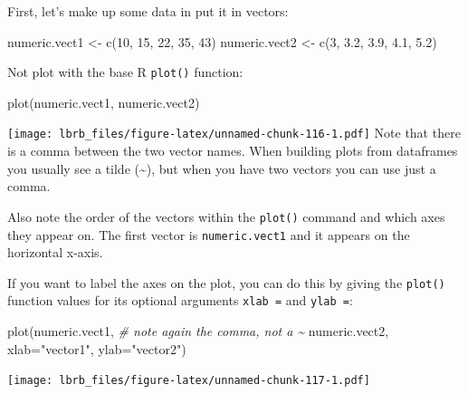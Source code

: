 \documentclass[
]{book}
\newenvironment{Shaded}{\begin{snugshade}}{\end{snugshade}}
\newcommand{\AttributeTok}[1]{\textcolor[rgb]{0.77,0.63,0.00}{#1}}
\newcommand{\CommentTok}[1]{\textcolor[rgb]{0.56,0.35,0.01}{\textit{#1}}}
\newcommand{\DecValTok}[1]{\textcolor[rgb]{0.00,0.00,0.81}{#1}}
\newcommand{\FloatTok}[1]{\textcolor[rgb]{0.00,0.00,0.81}{#1}}
\newcommand{\FunctionTok}[1]{\textcolor[rgb]{0.00,0.00,0.00}{#1}}
\newcommand{\NormalTok}[1]{#1}
\newcommand{\OtherTok}[1]{\textcolor[rgb]{0.56,0.35,0.01}{#1}}
\newcommand{\StringTok}[1]{\textcolor[rgb]{0.31,0.60,0.02}{#1}}
\begin{document}
First, let's make up some data in put it in vectors:

\begin{Shaded}
\begin{Highlighting}[]
\NormalTok{numeric.vect1 }\OtherTok{\textless{}{-}} \FunctionTok{c}\NormalTok{(}\DecValTok{10}\NormalTok{, }\DecValTok{15}\NormalTok{, }\DecValTok{22}\NormalTok{, }\DecValTok{35}\NormalTok{, }\DecValTok{43}\NormalTok{)}
\NormalTok{numeric.vect2 }\OtherTok{\textless{}{-}} \FunctionTok{c}\NormalTok{(}\DecValTok{3}\NormalTok{, }\FloatTok{3.2}\NormalTok{, }\FloatTok{3.9}\NormalTok{, }\FloatTok{4.1}\NormalTok{, }\FloatTok{5.2}\NormalTok{)}
\end{Highlighting}
\end{Shaded}

Not plot with the base R \texttt{plot()} function:

\begin{Shaded}
\begin{Highlighting}[]
\FunctionTok{plot}\NormalTok{(numeric.vect1, numeric.vect2)}
\end{Highlighting}
\end{Shaded}

\texttt{[image: lbrb\_files/figure-latex/unnamed-chunk-116-1.pdf]}
Note that there is a comma between the two vector names. When building plots from dataframes you usually see a tilde (\textasciitilde), but when you have two vectors you can use just a comma.

Also note the order of the vectors within the \texttt{plot()} command and which axes they appear on. The first vector is \texttt{numeric.vect1} and it appears on the horizontal x-axis.

If you want to label the axes on the plot, you can do this by giving the \texttt{plot()} function values for its optional arguments \texttt{xlab\ =} and \texttt{ylab\ =}:

\begin{Shaded}
\begin{Highlighting}[]
\FunctionTok{plot}\NormalTok{(numeric.vect1,   }\CommentTok{\# note again the comma, not a \textasciitilde{}}
\NormalTok{     numeric.vect2, }
     \AttributeTok{xlab=}\StringTok{"vector1"}\NormalTok{, }
     \AttributeTok{ylab=}\StringTok{"vector2"}\NormalTok{)}
\end{Highlighting}
\end{Shaded}

\texttt{[image: lbrb\_files/figure-latex/unnamed-chunk-117-1.pdf]}
\end{document}
